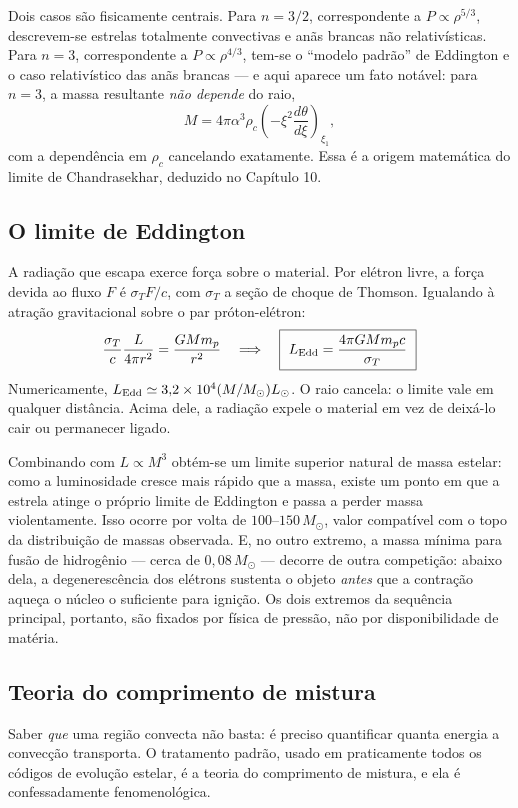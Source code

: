\documentclass[11pt,a4paper]{article}
\begin{document}
Dois casos são fisicamente centrais. Para $n=3/2$, correspondente a $P\propto\rho^{5/3}$, descrevem-se estrelas totalmente convectivas e anãs brancas não relativísticas. Para $n=3$, correspondente a $P\propto\rho^{4/3}$, tem-se o ``modelo padrão'' de Eddington e o caso relativístico das anãs brancas --- e aqui aparece um fato notável: para $n=3$, a massa resultante \emph{não depende} do raio,
\[
M=4\pi\alpha^{3}\rho_c\left(-\xi^{2}\frac{d\theta}{d\xi}\right)_{\xi_1},
\]
com a dependência em $\rho_c$ cancelando exatamente. Essa é a origem matemática do limite de Chandrasekhar, deduzido no Capítulo 10.

\subsection*{O limite de Eddington}

A radiação que escapa exerce força sobre o material. Por elétron livre, a força devida ao fluxo $F$ é $\sigma_TF/c$, com $\sigma_T$ a seção de choque de Thomson. Igualando à atração gravitacional sobre o par próton-elétron:
\[
\frac{\sigma_T}{c}\frac{L}{4\pi r^{2}}=\frac{GMm_p}{r^{2}}
\quad\Longrightarrow\quad
\boxed{\ L_{\rm Edd}=\frac{4\pi GMm_pc}{\sigma_T}\ }
\]
Numericamente, $L_{\rm Edd}\simeq3{,}2\times10^{4}(M/M_\odot)L_\odot$. O raio cancela: o limite vale em qualquer distância. Acima dele, a radiação expele o material em vez de deixá-lo cair ou permanecer ligado.

Combinando com $L\propto M^{3}$ obtém-se um limite superior natural de massa estelar: como a luminosidade cresce mais rápido que a massa, existe um ponto em que a estrela atinge o próprio limite de Eddington e passa a perder massa violentamente. Isso ocorre por volta de $100$--$150\,M_\odot$, valor compatível com o topo da distribuição de massas observada. E, no outro extremo, a massa mínima para fusão de hidrogênio --- cerca de $0{,}08\,M_\odot$ --- decorre de outra competição: abaixo dela, a degenerescência dos elétrons sustenta o objeto \emph{antes} que a contração aqueça o núcleo o suficiente para ignição. Os dois extremos da sequência principal, portanto, são fixados por física de pressão, não por disponibilidade de matéria.


\subsection*{Teoria do comprimento de mistura}

Saber \emph{que} uma região convecta não basta: é preciso quantificar quanta energia a convecção transporta. O tratamento padrão, usado em praticamente todos os códigos de evolução estelar, é a teoria do comprimento de mistura, e ela é confessadamente fenomenológica.
\end{document}
